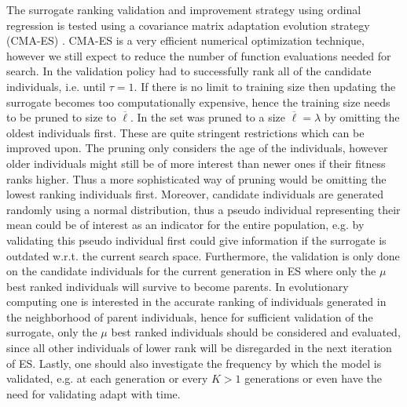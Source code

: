 \documentclass[10pt, conference]{IEEEtran} %
\begin{document}
The surrogate ranking validation and improvement strategy using ordinal regression is tested using a covariance matrix adaptation evolution strategy (CMA-ES) \cite{hansen:ostermeier:01}. CMA-ES is a very efficient numerical optimization technique, however we still expect to reduce the number of function evaluations needed for search. In \cite{Ru06:PPSN} the validation policy had to successfully rank all of the candidate individuals, i.e. until $\tau=1$. %
If there is no limit to training size then updating the surrogate becomes too computationally expensive, hence the training size needs to be pruned to size to $\overline{\ell}$. %
In \cite{Ru06:PPSN} the set was pruned to a size $\overline{\ell} = \lambda$ by omitting the oldest individuals first. These are quite stringent restrictions which can be improved upon. 
The pruning only considers the age of the individuals, however older individuals might still be of more interest than newer ones if their fitness ranks higher. Thus a more sophisticated way of pruning would be omitting the lowest ranking individuals first. 
Moreover, candidate individuals are generated randomly using a normal distribution, thus a pseudo individual representing their mean could be of interest as an indicator for the entire population, e.g. by validating this pseudo individual first could give information if the surrogate is outdated w.r.t. the current search space. 
Furthermore, the validation is only done on the candidate individuals for the current generation in ES where only the $\mu$ best ranked individuals will survive to become parents. In evolutionary computing one is interested in the accurate ranking of individuals  generated in the neighborhood of parent individuals, hence for sufficient validation of the surrogate, only the $\mu$ best ranked individuals  should be considered and evaluated, since all other individuals  of lower rank will be disregarded in the next iteration of ES. 
Lastly, one should also investigate the frequency by which the model is validated, e.g. at each generation or every $K>1$ generations or even have the need for validating adapt with time.
\end{document}
